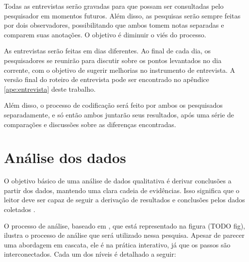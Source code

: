 Todas as entrevistas serão gravadas para que possam ser consultadas pelo
pesquisador em momentos futuros. Além disso, as pesquisas serão sempre feitas
por dois observadores, possibilitando que ambos tomem notas separadas e comparem
suas anotações. O objetivo é diminuir o viés do processo.

As entrevistas serão feitas em dias diferentes. Ao final de cada dia, os
pesquisadores se reunirão para discutir sobre os pontos levantados no dia
corrente, com o objetivo de sugerir melhorias no instrumento de entrevista. A
versão final do roteiro de entrevista pode ser encontrado no apêndice 
\ref{ape:entrevista} deste trabalho.

Além disso, o processo de codificação \cite{seaman} será feito por ambos os
pesquisados separadamente, e só então ambos juntarão seus resultados, após uma 
série de comparações e discussões sobre as diferenças encontradas.

\section{Análise dos dados}
\label{sec:planejamento-analise}

O objetivo básico de uma análise de dados qualitativa é derivar conclusões a
partir dos dados, mantendo uma clara cadeia de evidências. Isso significa que  o
leitor deve ser capaz de seguir a derivação de resultados e conclusões pelos 
dados coletados \cite{yin}.

O processo de análise, baseado em \cite{creswell}, que está representado na
figura (TODO fig), ilustra o processo de análise que será utilizado nessa
pesquisa. Apesar de parecer uma abordagem em cascata, ele é na prática 
interativo, já que os passos são interconectados. Cada um dos níveis é 
detalhado a seguir:

